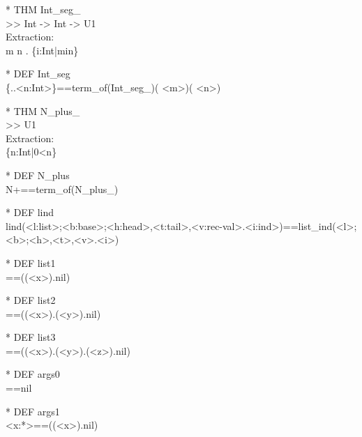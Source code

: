 \begin{prl*}
\>* THM Int\_seg\_\\
\>  >> Int -> Int -> U1\\
\>  Extraction:\\
\>  \mlambda{}  m  n .  \{i:Int|m\mleq{}i\mleq{}n\}
\end{prl*}

\begin{prl*}
\>* DEF Int\_seg\\
\>  \{<m:Int>..<n:Int>\}==term\_of(Int\_seg\_)( <m>)( <n>)
\end{prl*}

\begin{prl*}
\>* THM N\_plus\_\\
\>  >> U1\\
\>  Extraction:\\
\>  \{n:Int|0<n\}
\end{prl*}

\begin{prl*}
\>* DEF N\_plus\\
\>  N+==term\_of(N\_plus\_)
\end{prl*}

\begin{prl*}
\>* DEF lind\\
\>  lind(<l:list>;<b:base>;<h:head>,<t:tail>,<v:rec-val>.<i:ind>)==list\_ind(<l>;<b>;<h>,<t>,<v>.<i>)
\end{prl*}

\begin{prl*}
\>* DEF list1\\
\>  [<x:*>]==((<x>).nil)
\end{prl*}

\begin{prl*}
\>* DEF list2\\
\>  [<x:*>;<y:*>]==((<x>).(<y>).nil)
\end{prl*}

\begin{prl*}
\>* DEF list3\\
\>  [<x:*>;<y:*>;<z:*>]==((<x>).(<y>).(<z>).nil)
\end{prl*}

\begin{prl*}
\>* DEF args0\\
\>  ==nil
\end{prl*}

\begin{prl*}
\>* DEF args1\\
\>  <x:*>==((<x>).nil)
\end{prl*}

